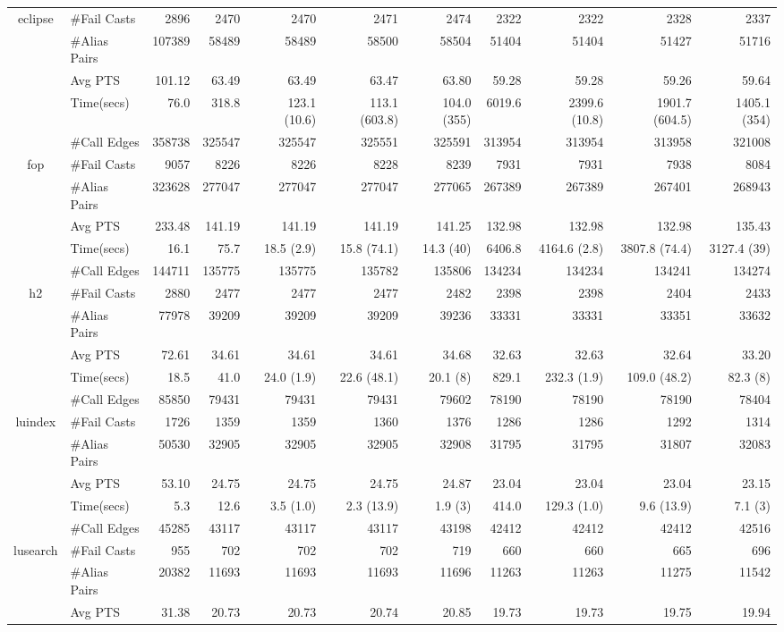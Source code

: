 \begin{table}[]
{\begin{tabular}{|c|l|r||r|>{\columncolor{pink!35}}r|>{\columncolor{lightgray!75}}r|>{\columncolor{orange!15}}r||r|>{\columncolor{pink!35}}r|>{\columncolor{lightgray!75}}r|>{\columncolor{orange!15}}r|}
eclipse&\#Fail Casts&2896&2470&2470&2471&2474&2322&2322&2328&2337\\
&\#Alias Pairs&107389&58489&58489&58500&58504&51404&51404&51427&51716\\
&Avg PTS&101.12&63.49&63.49&63.47&63.80&59.28&59.28&59.26&59.64\\
\hline
&Time(secs)&76.0&318.8&123.1 (10.6)&113.1 (603.8)&104.0 (355)&6019.6&2399.6 (10.8)&1901.7 (604.5)&1405.1 (354)\\
&\#Call Edges&358738&325547&325547&325551&325591&313954&313954&313958&321008\\
fop&\#Fail Casts&9057&8226&8226&8228&8239&7931&7931&7938&8084\\
&\#Alias Pairs&323628&277047&277047&277047&277065&267389&267389&267401&268943\\
&Avg PTS&233.48&141.19&141.19&141.19&141.25&132.98&132.98&132.98&135.43\\
\hline
&Time(secs)&16.1&75.7&18.5 (2.9)&15.8 (74.1)&14.3 (40)&6406.8&4164.6 (2.8)&3807.8 (74.4)&3127.4 (39)\\
&\#Call Edges&144711&135775&135775&135782&135806&134234&134234&134241&134274\\
h2&\#Fail Casts&2880&2477&2477&2477&2482&2398&2398&2404&2433\\
&\#Alias Pairs&77978&39209&39209&39209&39236&33331&33331&33351&33632\\
&Avg PTS&72.61&34.61&34.61&34.61&34.68&32.63&32.63&32.64&33.20\\
\hline
&Time(secs)&18.5&41.0&24.0 (1.9)&22.6 (48.1)&20.1 (8)&829.1&232.3 (1.9)&109.0 (48.2)&82.3 (8)\\
&\#Call Edges&85850&79431&79431&79431&79602&78190&78190&78190&78404\\
luindex&\#Fail Casts&1726&1359&1359&1360&1376&1286&1286&1292&1314\\
&\#Alias Pairs&50530&32905&32905&32905&32908&31795&31795&31807&32083\\
&Avg PTS&53.10&24.75&24.75&24.75&24.87&23.04&23.04&23.04&23.15\\
\hline
&Time(secs)&5.3&12.6&3.5 (1.0)&2.3 (13.9)&1.9 (3)&414.0&129.3 (1.0)&9.6 (13.9)&7.1 (3)\\
&\#Call Edges&45285&43117&43117&43117&43198&42412&42412&42412&42516\\
lusearch&\#Fail Casts&955&702&702&702&719&660&660&665&696\\
&\#Alias Pairs&20382&11693&11693&11693&11696&11263&11263&11275&11542\\
&Avg PTS&31.38&20.73&20.73&20.74&20.85&19.73&19.73&19.75&19.94\\

\end{tabular}}
\end{table}
